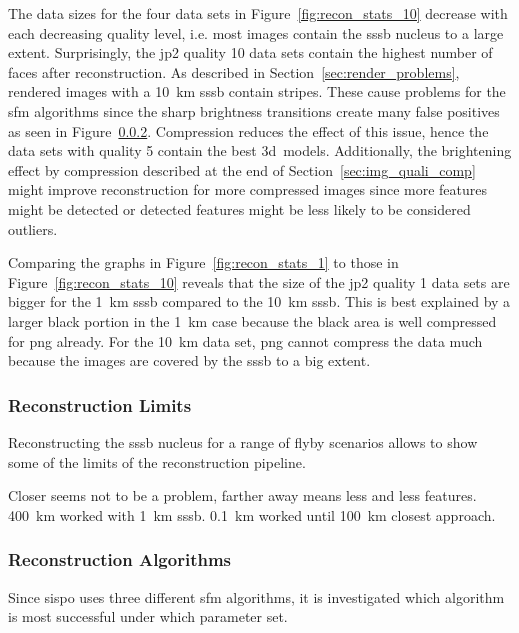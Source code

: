 The data sizes for the four data sets in Figure~\ref{fig:recon_stats_10} decrease with each decreasing quality level, i.e. most images contain the \gls{sssb} nucleus to a large extent. Surprisingly, the \gls{jp2} quality 10 data sets contain the highest number of faces after reconstruction. As described in Section~\ref{sec:render_problems}, rendered images with a \SI{10}{\kilo\meter} \gls{sssb} contain stripes. These cause problems for the \gls{sfm} algorithms since the sharp brightness transitions create many false positives as seen in Figure~\ref{}. Compression reduces the effect of this issue, hence the data sets with quality 5 contain the best \gls{3d}~models. Additionally, the brightening effect by compression described at the end of Section~\ref{sec:img_quali_comp} might improve reconstruction for more compressed images since more features might be detected or detected features might be less likely to be considered outliers.

Comparing the graphs in Figure~\ref{fig:recon_stats_1} to those in Figure~\ref{fig:recon_stats_10} reveals that the size of the \gls{jp2} quality 1 data sets are bigger for the \SI{1}{\kilo\meter} \gls{sssb} compared to the \SI{10}{\kilo\meter} \gls{sssb}. This is best explained by a larger black portion in the \SI{1}{\kilo\meter} case because the black area is well compressed for \gls{png} already. For the \SI{10}{\kilo\meter} data set, \gls{png} cannot compress the data much because the images are covered by the \gls{sssb} to a big extent.

\subsubsection{Reconstruction Limits}
Reconstructing the \gls{sssb} nucleus for a range of flyby scenarios allows to show some of the limits of the reconstruction pipeline.

Closer seems not to be a problem, farther away means less and less features. \SI{400}{\kilo\meter} worked with \SI{1}{\kilo\meter} \gls{sssb}. 
\SI{0.1}{\kilo\meter} worked until \SI{100}{\kilo\meter} closest approach.


\subsubsection{Reconstruction Algorithms}
Since \gls{sispo} uses three different \gls{sfm} algorithms, it is investigated which algorithm is most successful under which parameter set.

